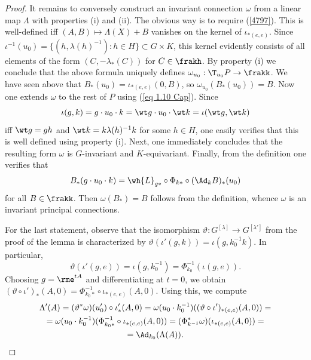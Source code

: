 \begin{proof}
    It remains to conversely construct an invariant connection $\omega$ from a linear map $\Lambda$ with properties (i) and (ii). The obvious way is to require (\ref{4797}). This is well-defined iff $(A,B)\mapsto \Lambda(X)+B$ vanishes on the kernel of $\iota_{\ast(e,e)}$. Since $\iota^{-1}(u_0)=\{(h,\lambda(h)^{-1}):h\in H\}\subset G\times K$, this kernel evidently consists of all elements of the form $(C,-\lambda_\ast(C))$ for $C\in \frakh$. By property (i) we conclude that the above formula uniquely defines $\omega_{u_0}:\T_{u_0}P\to \frakk$. We have seen above that $B_\ast(u_0)=\iota_{\ast(e,e)}(0,B)$, so $\omega_{u_0}(B_\ast(u_0))=B$. Now one extends $\omega$ to the rest of $P$ using (\ref{eq 1.10 Cap}). Since 
    \[\iota(g,k)=g\cdot u_0\cdot k=\wt g\cdot u_0\cdot \wt k=\iota(\wt g,\wt k)\]
    iff $\wt g=gh$ and $\wt k =k\lambda(h)^{-1}k$ for some $h\in H$, one easily verifies that this is well defined using property (i). Next, one immediately concludes that the resulting form $\omega$ is $G$-invariant and $K$-equivariant. Finally, from the definition one verifies that 
    \[B_\ast(g\cdot u_0\cdot k)=\wh{L}_{g\ast}\circ \Phi_{k\ast}\circ (\Ad_k B)_\ast(u_0)\]
    for all $B\in\frakk$. Then $\omega(B_\ast)=B$ follows from the definition, whence $\omega$ is an invariant principal connections.

    For the last statement, observe that the isomorphism $\vartheta:G^{[\lambda]}\to G^{[\lambda']}$ from the proof of the lemma is characterized by $\vartheta(\iota'(g,k))=\iota(g,k_0^{-1}k)$. In particular, 
    \[\vartheta(\iota'(g,e))=\iota(g,k_0^{-1})=\Phi_{k_0}^{-1}(\iota(g,e)).\]
    Choosing $g=\rme^{tA}$ and differentiating at $t=0$, we obtain $(\vartheta\circ \iota')_\ast(A,0)=\Phi_{k_0\ast}^{-1}\circ \iota_{\ast(e,e)}(A,0)$. Using this, we compute 
    \begin{multline}
        \Lambda'(A)=(\vartheta^\ast \omega)(u_0')\circ \iota'_\ast(A,0)=\omega(u_0\cdot k_0^{-1})((\vartheta\circ \iota')_{\ast(e,e)}(A,0))=\\
        =\omega(u_0\cdot k_0^{-1})(\Phi_{k_0\ast}^{-1}\circ \iota_{\ast(e,e)}(A,0))=(\Phi_{k^{-1}}^\ast\omega)(\iota_{\ast(e,e)}(A,0))=\\
        =\Ad_{k_0}(\Lambda(A)).
    \end{multline}
\end{proof}

